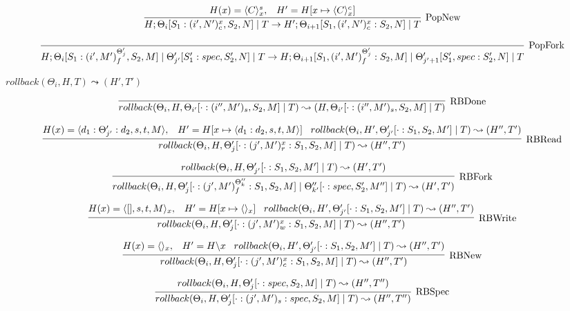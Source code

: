 \documentclass[9pt]{article}
\begin{document}
\[%
\infer[\text{PopNew}]{H; \Theta_i[S_1 : (i', N')_c^x, S_2, N] \; | \; T \rightarrow H';  \Theta_{i+1}[S_1, (i', N')_c^x : S_2, N] \; | \; T}{H(x) = \langle C \rangle_x^s, \;\;\; H' = H[x \mapsto \langle C\rangle_x^c]}
\]

\[%
\infer[\text{PopFork}]{H; \Theta_i[S_1 : (i', M')_f^{\Theta_j'}, S_2, M] \; | \; \Theta_{j'}'[S_1' : spec, S_2', N] \; | \; T \rightarrow H; \Theta_{i+1}[S_1, (i', M')_f^{\Theta_j'} : S_2, M] \; | \; \Theta_{j' + 1}'[S_1', spec : S_2', N] \; | \; T}{}
\]

$\boxed{rollback(\Theta_i, H, T) \leadsto (H' ,T')}$

\[%
\infer[\text{RBDone}]{rollback(\Theta_i, H, \Theta_{i'}[\cdot : (i'', M')_s, S_2, M] \; | \; T) \leadsto (H, \Theta_{i'}[\cdot : (i'', M')_s, S_2, M] \; | \; T)}{}
\]

\[%
\infer[\text{RBRead}]{rollback(\Theta_i, H, \Theta_j'[\cdot : (j', M')_r^x : S_1, S_2, M] \; | \; T) \leadsto (H'', T')}{H(x) = \langle d_1 : \Theta_{j'}' : d_2, s, t, M\rangle, \;\;\; H' = H[x \mapsto \langle d_1 : d_2, s, t, M\rangle] \;\;\; rollback(\Theta_i, H', \Theta_{j'}'[\cdot : S_1, S_2, M'] \; | \; T) \leadsto (H'', T')}
\]

\[%
\infer[\text{RBFork}]{rollback(\Theta_i, H, \Theta_j'[\cdot : (j', M')_f^{\Theta_k''} : S_1, S_2, M] \; | \; \Theta_{k'}''[\cdot : spec, S_2', M''] \; | \; T) \leadsto (H', T')}{rollback(\Theta_i, H, \Theta_{j'}'[\cdot : S_1, S_2, M'] \; | \; T) \leadsto (H', T')}
\]

\[%
\infer[\text{RBWrite}]{rollback(\Theta_i, H, \Theta_j'[\cdot : (j', M')_w^x : S_1, S_2, M] \; | \; T) \leadsto (H'', T')}{H(x) = \langle [], s, t, M\rangle_x, \;\;\; H' = H[x \mapsto \langle\rangle_x] \;\;\; rollback(\Theta_i, H', \Theta_{j'}'[\cdot : S_1, S_2, M'] \; | \; T) \leadsto (H'', T')}
\]

\[%
\infer[\text{RBNew}]{rollback(\Theta_i, H, \Theta_j'[\cdot : (j', M')_c^x : S_1, S_2, M] \; | \; T) \leadsto (H'', T')}{H(x) = \langle\rangle_x, \;\;\; H' = H \backslash x \;\;\; rollback(\Theta_i, H', \Theta_{j'}'[\cdot : S_1, S_2, M'] \; | \; T) \leadsto (H'', T')}
\]

\[%
\infer[\text{RBSpec}]{rollback(\Theta_i, H, \Theta_j'[\cdot : (j', M')_s : spec, S_2, M] \; | \; T) \leadsto (H'', T'')}{rollback(\Theta_i, H, \Theta_j'[\cdot : spec, S_2, M] \; | \; T) \leadsto (H'', T'')}
\]
\end{document}
